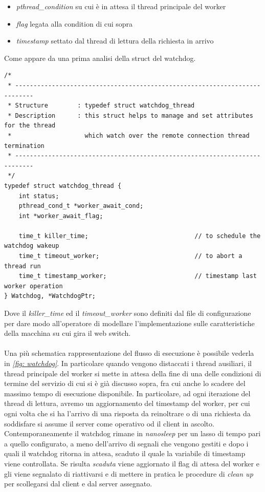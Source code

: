 \documentclass[italian]{tktltiki2}
\begin{document}
\begin{itemize}
	\item \emph{pthread\_condition} su cui è in attesa il thread principale del worker
	\item \emph{flag} legata alla condition di cui sopra
	\item \emph{timestamp} settato dal thread di lettura della richiesta in arrivo
\end{itemize}
Come appare da una prima analisi della struct del watchdog.
\begin{lstlisting}
/*
 * ---------------------------------------------------------------------------
 * Structure        : typedef struct watchdog_thread
 * Description      : this struct helps to manage and set attributes for the thread
 *                    which watch over the remote connection thread termination
 * ---------------------------------------------------------------------------
 */
typedef struct watchdog_thread {
    int status;                                     
    pthread_cond_t *worker_await_cond;             
    int *worker_await_flag;

    time_t killer_time;                             // to schedule the watchdog wakeup
    time_t timeout_worker;                          // to abort a thread run
    time_t timestamp_worker;                        // timestamp last worker operation
} Watchdog, *WatchdogPtr;

\end{lstlisting}
Dove il \emph{killer\_time} ed il \emph{timeout\_worker} sono definiti dal file di configurazione per dare modo all'operatore di modellare l'implementazione sulle caratteristiche della macchina su cui gira il web switch. \\\\
Una più schematica rappresentazione del flusso di esecuzione è possibile vederla in \emph{\ref{fig: watchdog}}.
In particolare quando vengono distaccati i thread ausiliari, il thread principale del worker si mette in attesa della fine di una delle condizioni di termine del servizio di cui si è già discusso sopra, fra cui anche lo scadere del massimo tempo di esecuzione disponibile. In particolare, ad ogni iterazione del thread di lettura, avremo un aggiornamento del timestamp del worker, per cui ogni volta che si ha l'arrivo di una risposta da reinoltrare o di una richiesta da soddisfare si assume il server come operativo od il client in ascolto. \\ 
Contemporaneamente il watchdog rimane in \emph{nanosleep} per un lasso di tempo pari a quello configurato, a meno dell'arrivo di segnali che vengono gestiti e dopo i quali il watchdog ritorna in attesa, scaduto il quale la variabile di timestamp viene controllata. Se risulta \emph{scaduta} viene aggiornato il flag di attesa del worker e gli viene segnalato di riattivarsi e di mettere in pratica le procedure di \emph{clean up} per scollegarsi dal client e dal server assegnato. \\\\
\end{document}
